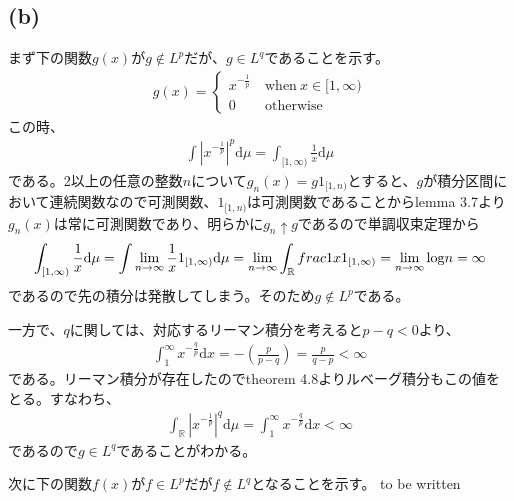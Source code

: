 \documentclass{article}
\begin{document}
\subsection{(b)}
まず下の関数$g(x)$が$g \notin L^p$だが、$g\in L^q$であることを示す。
\begin{align*}
	g(x) = \begin{cases}
	x^{-\frac{1}{p}}\ &\text{when}\ x \in [1, \infty)\\
	0\ &\text{otherwise}
	\end{cases}
\end{align*}
この時、
\begin{align*}
	\int |x^{-\frac{1}{p}}|^{p} \mathrm{d}\mu = \int_{[1,\infty)} \frac{1}{x} \mathrm{d}\mu
\end{align*}
である。2以上の任意の整数$n$について$g_n (x) = g1_{[1,n)}$とすると、$g$が積分区間において連続関数なので可測関数、$1_{[1,n)}$は可測関数であることからlemma 3.7より$g_n (x)$は常に可測関数であり、明らかに$g_n \uparrow g$であるので単調収束定理から
\begin{align*}
	\int_{[1,\infty)} \frac{1}{x} \mathrm{d}\mu = \int \lim_{n \to \infty} \frac{1}{x} 1_{[1, \infty)} \mathrm{d}\mu = \lim_{n \to \infty} \int_{\mathbb{R}} frac{1}{x} 1_{[1, \infty)} = \lim_{n \to \infty} {\rm log} n = \infty
\end{align*}
であるので先の積分は発散してしまう。そのため$g\notin L^p$である。

一方で、$q$に関しては、対応するリーマン積分を考えると$p-q < 0$より、
\begin{align*}
	\int_1^{\infty} x^{-\frac{q}{p}} \mathrm{d}x = -\left( \frac{p}{p-q} \right) = \frac{p}{q-p} < \infty
\end{align*}
である。リーマン積分が存在したのでtheorem 4.8よりルベーグ積分もこの値をとる。すなわち、
\begin{align*}
	\int_{\mathbb{R}} |x^{-\frac{1}{p}}|^q \mathrm{d}\mu = \int_1^{\infty} x^{-\frac{q}{p}} \mathrm{d}x < \infty
\end{align*}
であるので$g \in L^q$であることがわかる。

次に下の関数$f(x)$が$f\in L^p$だが$f\notin L^q$となることを示す。 to be written
\end{document}
